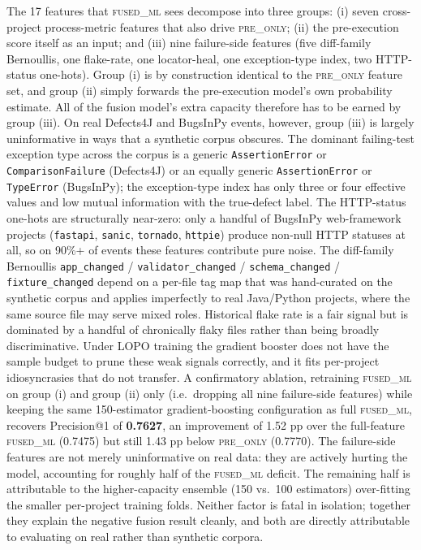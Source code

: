 \documentclass[preprint,12pt]{elsarticle}
\begin{document}
The 17 features that \textsc{fused\_ml} sees decompose into three groups: (i) seven cross-project process-metric features that also drive \textsc{pre\_only}; (ii) the pre-execution score itself as an input; and (iii) nine failure-side features (five diff-family Bernoullis, one flake-rate, one locator-heal, one exception-type index, two HTTP-status one-hots). Group (i) is by construction identical to the \textsc{pre\_only} feature set, and group (ii) simply forwards the pre-execution model's own probability estimate. All of the fusion model's extra capacity therefore has to be earned by group (iii). On real Defects4J and BugsInPy events, however, group (iii) is largely uninformative in ways that a synthetic corpus obscures. The dominant failing-test exception type across the corpus is a generic \texttt{AssertionError} or \texttt{ComparisonFailure} (Defects4J) or an equally generic \texttt{AssertionError} or \texttt{TypeError} (BugsInPy); the exception-type index has only three or four effective values and low mutual information with the true-defect label. The HTTP-status one-hots are structurally near-zero: only a handful of BugsInPy web-framework projects (\texttt{fastapi}, \texttt{sanic}, \texttt{tornado}, \texttt{httpie}) produce non-null HTTP statuses at all, so on 90\%+ of events these features contribute pure noise. The diff-family Bernoullis \texttt{app\_changed} / \texttt{validator\_changed} / \texttt{schema\_changed} / \texttt{fixture\_changed} depend on a per-file tag map that was hand-curated on the synthetic corpus and applies imperfectly to real Java/Python projects, where the same source file may serve mixed roles. Historical flake rate is a fair signal but is dominated by a handful of chronically flaky files rather than being broadly discriminative. Under LOPO training the gradient booster does not have the sample budget to prune these weak signals correctly, and it fits per-project idiosyncrasies that do not transfer. A confirmatory ablation, retraining \textsc{fused\_ml} on group (i) and group (ii) only (i.e.\ dropping all nine failure-side features) while keeping the same 150-estimator gradient-boosting configuration as full \textsc{fused\_ml}, recovers Precision@1 of \textbf{0.7627}, an improvement of 1.52 pp over the full-feature \textsc{fused\_ml} (0.7475) but still 1.43 pp below \textsc{pre\_only} (0.7770). The failure-side features are not merely uninformative on real data: they are actively hurting the model, accounting for roughly half of the \textsc{fused\_ml} deficit. The remaining half is attributable to the higher-capacity ensemble (150 vs.\ 100 estimators) over-fitting the smaller per-project training folds. Neither factor is fatal in isolation; together they explain the negative fusion result cleanly, and both are directly attributable to evaluating on real rather than synthetic corpora.
\end{document}
